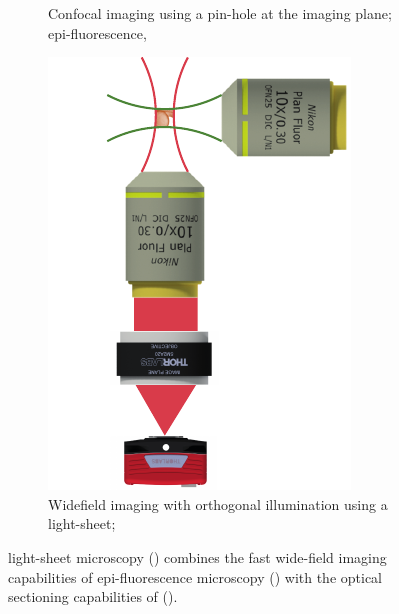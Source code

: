 \begin{figure}
\begin{subfigure}[t]{0.3\textwidth}
        \caption{Confocal imaging using a pin-hole at the imaging plane; epi-fluorescence, }
        \label{fig:epi_con_lsfm/confocal}
    \end{subfigure}
        \hfill%
    \begin{subfigure}[t]{0.3\textwidth}
        \centering
        \includegraphics{epi_con_lsfm/spim}
        \caption{Widefield imaging with orthogonal illumination using a \gls{light-sheet}; }
        \label{fig:epi_con_lsfm/spim}
    \end{subfigure}
    \hspace{0.01\textwidth}
    \caption[Comparison of \gls{wide-field}, \gls{confocal} and \gls{light-sheet} microscopy imaging modalities]
    {\Gls{light-sheet} microscopy () combines the fast \gls{wide-field} imaging capabilities of epi-fluorescence microscopy () with the optical sectioning capabilities of  ().
    }
    \label{fig:epi_con_lsfm}
\end{figure}



